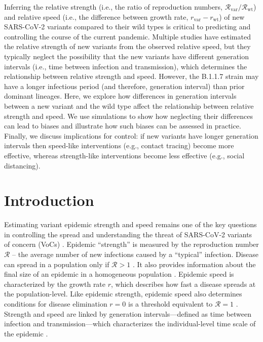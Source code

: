 \documentclass[12pt]{article}
\newcommand{\vvvar}{\mathrm{var}}
\newcommand{\wwwt}{\mathrm{wt}}
\newcommand{\rx}[1]{\ensuremath{{r}_{#1}}\xspace}
\newcommand{\rw}{\rx{\wwwt}}
\newcommand{\rv}{\rx{\vvvar}}
\newcommand{\Rx}[1]{\ensuremath{{\mathcal R}_{#1}}\xspace}
\newcommand{\RR}{\ensuremath{{\mathcal R}}\xspace}
\newcommand{\Rw}{\Rx{\wwwt}}
\newcommand{\Rv}{\Rx{\vvvar}}
\begin{document}
Inferring the relative strength (i.e., the ratio of reproduction numbers, $\Rv/\Rw$) and relative speed (i.e., the difference between growth rate, $\rv-\rw$) of new SARS-CoV-2 variants compared to their wild types is critical to predicting and controlling the course of the current pandemic.
Multiple studies have estimated the relative strength of new variants from the observed relative speed, but they typically neglect the possibility that the new variants have different generation intervals (i.e., time between infection and transmission), which determines the relationship between relative strength and speed.
However, the B.1.1.7 strain may have a longer infectious period (and therefore, generation interval) than prior dominant lineages.
Here, we explore how differences in generation intervals between a new variant and the wild type affect the relationship between relative strength and speed.
We use simulations to show how neglecting their differences can lead to biases and illustrate how such biases can be assessed in practice.
Finally, we discuss implications for control: if new variants have longer generation intervals then speed-like interventions (e.g., contact tracing) become more effective, whereas strength-like interventions become less effective (e.g., social distancing).

\section{Introduction}

Estimating variant epidemic strength and speed remains one of the key questions in controlling the spread and understanding the threat of SARS-CoV-2 variants of concern (VoCs) \citep{switzerland2021variant, davies2021estimated, di2021impact, leung2021early, volz2021transmission,zhao2021}.
Epidemic ``strength'' is measured by the reproduction number $\RR$ -- the average number of new infections caused by a ``typical'' infection. 
Disease can spread in a population only if $\RR>1$ \citep{diekmann1990definition}.
It also provides information about the final size of an epidemic in a homogeneous population \citep{anderson1991infectious}.
Epidemic speed is characterized by the growth rate $r$, which describes how fast a disease spreads at the population-level.
Like epidemic strength, epidemic speed also determines conditions for disease elimination $r=0$ is a threshold equivalent to $\RR=1$ \citep{doi:10.1098/rspb.2020.1556}.
Strength and speed are linked by generation intervals---defined as time between infection and transmission---which characterizes the individual-level time scale of the epidemic \citep{roberts2007model,svensson2007note,wallinga2007generation}.
\end{document}
